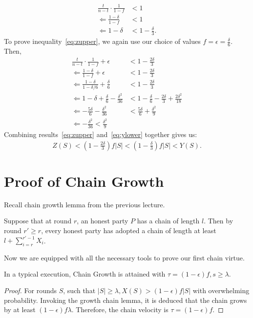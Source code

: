 \begin{align}
\frac{t}{n-t}\cdot\frac{1}{1-f} &< 1\\
\Leftarrow \frac{1-\delta}{1-f} &< 1\\
\Leftarrow 1-\delta &< 1 -\frac{\delta}{3}.
\end{align}
To prove inequality~\ref{eq:zupper}, we again use our choice of values $f = \epsilon = \frac{\delta}{6}$. Then,
\begin{align}
    \frac{t}{n-t}\cdot\frac{1}{1-f} + \epsilon &< 1 - \frac{2\delta}{3}\\
    \Leftarrow \frac{1-\delta}{1-f} + \epsilon &< 1-\frac{2\delta}{3}\\
    \Leftarrow \frac{1-\delta}{1-\delta/6} + \frac{\delta}{6} &< 1 - \frac{2\delta}{3}\\
    \Leftarrow 1-\delta + \frac{\delta}{6} -\frac{\delta^2}{36} &< 1- \frac{\delta}{6} -\frac{2\delta}{3} + \frac{2\delta^2}{18}\\
    \Leftarrow -\frac{5\delta}{6}-\frac{\delta^2}{36} &< \frac{5\delta}{6} + \frac{\delta^2}{9}\\
    \Leftarrow -\frac{\delta^2}{36} < \frac{\delta^2}{9}
\end{align}
Combining results~\ref{eq:zupper} and~\ref{eq:ylower} together gives us:
\begin{align}
Z(S) < \left(1 - \frac{2\delta}{3}\right)f|S| <  \left(1 - \frac{\delta}{3}\right)f|S| <
Y(S).
\end{align}

\section{Proof of Chain Growth}
Recall chain growth lemma from the previous lecture.
\begin {lemma}
    Suppose that at round $r$, an honest party $P$ has a chain of length $l$. Then by round $r' \geq r$, every honest party has adopted a chain of length at least $l + \sum_{i=r}^{r'-1} X_i$.
\end {lemma}
Now we are equipped with all the necessary tools to prove our first chain virtue.

\begin{theorem}\label{thm:chain-growth}
In a typical execution, Chain Growth is attained with $\tau = (1-\epsilon)f, s \geq \lambda$.
\end{theorem}
\begin{proof}
For rounds $S$, such that $|S| \geq \lambda, X(S) > (1-\epsilon)f|S|$ with overwhelming probability. Invoking the growth chain lemma, it is deduced that the chain grows by at least $(1-\epsilon)f\lambda$. Therefore, the chain velocity is $\tau = (1-\epsilon)f$.
\end{proof}


